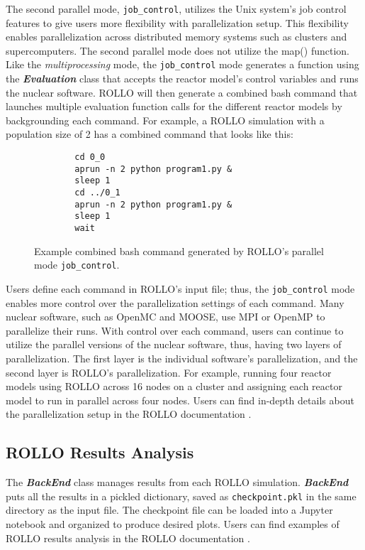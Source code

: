 The second parallel mode, \texttt{job\_control}, utilizes the Unix system's job control 
features to give users more flexibility with parallelization setup. 
This flexibility enables parallelization across distributed memory systems such as 
clusters and supercomputers. 
The second parallel mode does not utilize the map() function. 
Like the \textit{multiprocessing} mode, the \texttt{job\_control} mode generates a 
function using the \textbf{\textit{Evaluation}} class that accepts the reactor model's control 
variables and runs the nuclear software. 
\gls{ROLLO} will then generate a combined bash command that launches multiple evaluation 
function calls for the different reactor models by backgrounding each command.
For example, a ROLLO simulation with a population size of 2 has a combined command that
looks like this:
\begin{figure}[H]
    \centering
    \begin{minipage}{0.5\textwidth}
    \begin{verbatim}
        cd 0_0
        aprun -n 2 python program1.py &
        sleep 1 
        cd ../0_1 
        aprun -n 2 python program1.py &
        sleep 1 
        wait
    \end{verbatim}
    \end{minipage}
    \caption{Example combined bash command generated by \gls{ROLLO}'s parallel mode \texttt{job\_control}.}
    \label{fig:job-control-example}
\end{figure}
Users define each command in ROLLO's input file; thus, the \texttt{job\_control} mode enables 
more control over the parallelization settings of each command. 
Many nuclear software, such as OpenMC and MOOSE, use \gls{MPI} or OpenMP to parallelize their runs. 
With control over each command, users can continue to utilize the parallel 
versions of the nuclear software, thus, having two layers of parallelization. 
The first layer is the individual software's parallelization, and the second layer is ROLLO's parallelization. 
For example, running four reactor models using ROLLO across 16 nodes on a cluster and assigning each reactor 
model to run in parallel across four nodes. 
Users can find in-depth details about the parallelization setup in the ROLLO documentation
 \cite{chee_documentation_2021}.

\subsection{ROLLO Results Analysis}
The \textbf{\textit{BackEnd}} class manages results from each \gls{ROLLO} simulation. 
\textbf{\textit{BackEnd}} puts all the results in a pickled dictionary, 
saved as \texttt{checkpoint.pkl} in the same directory as the input file. 
The checkpoint file can be loaded into a Jupyter notebook and organized 
to produce desired plots. 
Users can find examples of \gls{ROLLO} results analysis in the \gls{ROLLO} documentation
\cite{chee_documentation_2021}. 

